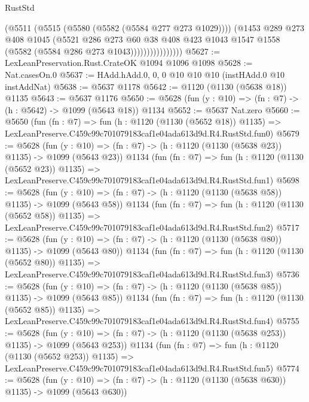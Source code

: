 \begin{lexlean}{RustStd}
\begin{coremodule}
                          (@5511
                            (@5515 (@5580 (@5582 (@5584 @277 @273 @1029))))
                            (@1453
                              @289
                              @273
                              @408
                              @1045
                              (@5521
                                @286
                                @273
                                @60
                                @38
                                @408
                                @423
                                @1043
                                @1547
                                @1558
                                (@5582 (@5584 @286 @273 @1043))))))))))))))))
@5627 := LexLeanPreservation.Rust.CrateOK @1094 @1096 @1098
@5628 := Nat.casesOn.{0}
@5637 := HAdd.hAdd.{0, 0, 0} @10 @10 @10 (instHAdd.{0} @10 instAddNat)
@5638 := @5637 @1178
@5642 := @1120 (@1130 (@5638 @18)) @1135
@5643 := @5637 @1176
@5650 := @5628 (fun (y : @10) => (fn : @7) -> (h : @5642) -> @1099 (@5643 @18)) @1134
@5652 := @5637 Nat.zero
@5660 := @5650
    (fun (fn : @7) =>
    fun (h : @1120 (@1130 (@5652 @18)) @1135) =>
    LexLeanPreserve.C459c99c701079183caf1e04ada613d9d.R4.RustStd.fun0)
@5679 := @5628
    (fun (y : @10) => (fn : @7) -> (h : @1120 (@1130 (@5638 @23)) @1135) -> @1099 (@5643 @23))
    @1134
    (fun (fn : @7) =>
    fun (h : @1120 (@1130 (@5652 @23)) @1135) =>
    LexLeanPreserve.C459c99c701079183caf1e04ada613d9d.R4.RustStd.fun1)
@5698 := @5628
    (fun (y : @10) => (fn : @7) -> (h : @1120 (@1130 (@5638 @58)) @1135) -> @1099 (@5643 @58))
    @1134
    (fun (fn : @7) =>
    fun (h : @1120 (@1130 (@5652 @58)) @1135) =>
    LexLeanPreserve.C459c99c701079183caf1e04ada613d9d.R4.RustStd.fun2)
@5717 := @5628
    (fun (y : @10) => (fn : @7) -> (h : @1120 (@1130 (@5638 @80)) @1135) -> @1099 (@5643 @80))
    @1134
    (fun (fn : @7) =>
    fun (h : @1120 (@1130 (@5652 @80)) @1135) =>
    LexLeanPreserve.C459c99c701079183caf1e04ada613d9d.R4.RustStd.fun3)
@5736 := @5628
    (fun (y : @10) => (fn : @7) -> (h : @1120 (@1130 (@5638 @85)) @1135) -> @1099 (@5643 @85))
    @1134
    (fun (fn : @7) =>
    fun (h : @1120 (@1130 (@5652 @85)) @1135) =>
    LexLeanPreserve.C459c99c701079183caf1e04ada613d9d.R4.RustStd.fun4)
@5755 := @5628
    (fun (y : @10) => (fn : @7) -> (h : @1120 (@1130 (@5638 @253)) @1135) -> @1099 (@5643 @253))
    @1134
    (fun (fn : @7) =>
    fun (h : @1120 (@1130 (@5652 @253)) @1135) =>
    LexLeanPreserve.C459c99c701079183caf1e04ada613d9d.R4.RustStd.fun5)
@5774 := @5628
    (fun (y : @10) => (fn : @7) -> (h : @1120 (@1130 (@5638 @630)) @1135) -> @1099 (@5643 @630))

\end{coremodule}
\end{lexlean}
